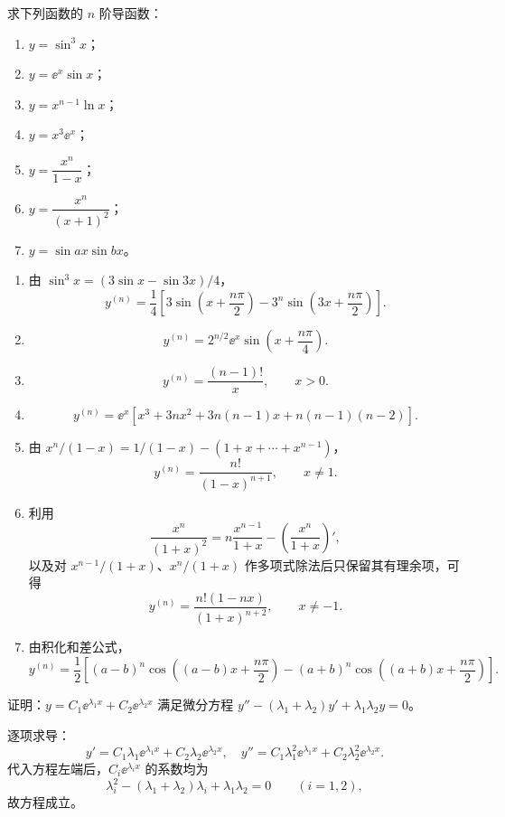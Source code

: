 \begin{xexercise}[5]
求下列函数的 $n$ 阶导函数：
  \begin{enumerate}[label=(\arabic*)]
    \item $y=\sin^3x$；
    \item $y=\ee^x\sin x$；
    \item $y=x^{n-1}\ln x$；
    \item $y=x^3\ee^x$；
    \item $y=\dfrac{x^n}{1-x}$；
    \item $y=\dfrac{x^n}{(x+1)^2}$；
    \item $y=\sin ax\sin bx$。
  \end{enumerate}
\end{xexercise}
\begin{xsolution}
\begin{enumerate}[label=(\arabic*)]
  \item 由 $\sin^3x=(3\sin x-\sin3x)/4$，
  \[
    \boxed{y^{(n)}=\frac14\left[3\sin\left(x+\frac{n\pi}{2}\right)-3^n\sin\left(3x+\frac{n\pi}{2}\right)\right]}.
  \]
  \item
  \[
    \boxed{y^{(n)}=2^{n/2}\ee^x\sin\left(x+\frac{n\pi}{4}\right)}.
  \]
  \item
  \[
    \boxed{y^{(n)}=\frac{(n-1)!}{x}},\qquad x>0.
  \]
  \item
  \[
    \boxed{y^{(n)}=\ee^x\left[x^3+3nx^2+3n(n-1)x+n(n-1)(n-2)\right]}.
  \]
  \item 由 $x^n/(1-x)=1/(1-x)-(1+x+\cdots+x^{n-1})$，
  \[
    \boxed{y^{(n)}=\frac{n!}{(1-x)^{n+1}}},\qquad x\ne1.
  \]
  \item 利用
  \[
    \frac{x^n}{(1+x)^2}=n\frac{x^{n-1}}{1+x}-\left(\frac{x^n}{1+x}\right)',
  \]
  以及对 $x^{n-1}/(1+x)$、$x^n/(1+x)$ 作多项式除法后只保留其有理余项，可得
  \[
    \boxed{y^{(n)}=\frac{n!(1-nx)}{(1+x)^{n+2}}},\qquad x\ne-1.
  \]
  \item 由积化和差公式，
  \[
    \boxed{y^{(n)}=\frac12\left[(a-b)^n\cos\left((a-b)x+\frac{n\pi}{2}\right)-(a+b)^n\cos\left((a+b)x+\frac{n\pi}{2}\right)\right]}.
  \]
\end{enumerate}
\end{xsolution}


\begin{xexercise}[6]
证明：$y=C_1\ee^{\lambda_1x}+C_2\ee^{\lambda_2x}$ 满足微分方程 $y''-(\lambda_1+\lambda_2)y'+\lambda_1\lambda_2y=0$。
\end{xexercise}
\begin{xsolution}
逐项求导：
\[
  y'=C_1\lambda_1\ee^{\lambda_1x}+C_2\lambda_2\ee^{\lambda_2x},
  \quad
  y''=C_1\lambda_1^2\ee^{\lambda_1x}+C_2\lambda_2^2\ee^{\lambda_2x}.
\]
代入方程左端后，$C_i\ee^{\lambda_i x}$ 的系数均为
\[
  \lambda_i^2-(\lambda_1+\lambda_2)\lambda_i+\lambda_1\lambda_2=0
  \qquad(i=1,2),
\]
故方程成立。
\end{xsolution}


